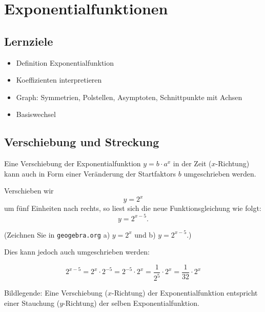 
\section{Exponentialfunktionen}
\subsection*{Lernziele}

\begin{itemize}
\item Definition Exponentialfunktion
\item Koeffizienten interpretieren
\item Graph: Symmetrien, Polstellen, Asymptoten, Schnittpunkte mit
  Achsen
  \item Basiswechsel
\end{itemize}

\newpage


\subsection{Verschiebung und Streckung}

Eine Verschiebung der Exponentialfunktion $y=b\cdot{}a^x$ in der Zeit ($x$-Richtung) kann auch in Form einer Veränderung der Startfaktors $b$ umgeschrieben werden.

Verschieben wir \zB $$y=2^x$$ um fünf Einheiten nach rechts, so liest sich die neue Funktionsgleichung wie folgt:
$$y=2^{x-5}.$$

(Zeichnen Sie in \texttt{geogebra.org} a) $y=2^x$ und b) $y=2^{x-5}$.)

Dies kann jedoch auch umgeschrieben werden:

$$2^{x-5} = 2^x \cdot{} 2^{-5} = 2^{-5} \cdot{} 2^x = \frac{1}{2^5} \cdot{} 2^x =
\frac{1}{32}\cdot{}2^x$$

Bildlegende: Eine Verschiebung ($x$-Richtung) der Exponentialfunktion entspricht einer Stauchung ($y$-Richtung) der selben Exponentialfunktion.



